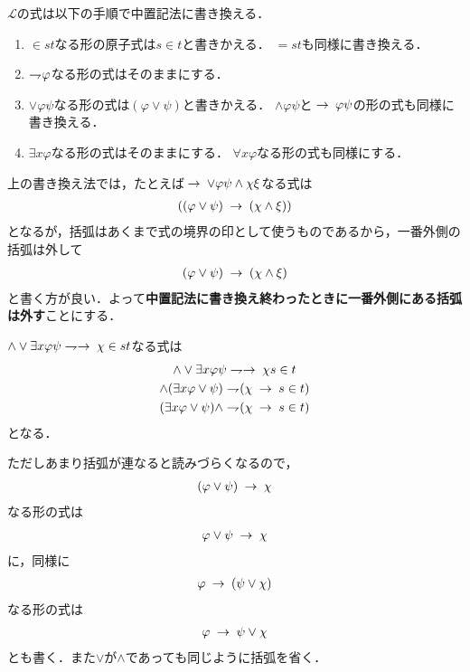 	\begin{screen}
		\begin{metadfn}[中置記法]
			$\mathcal{L}$の式は以下の手順で中置記法に書き換える．
			\begin{enumerate}
				\item $\in s t$なる形の原子式は$s \in t$と書きかえる．
					$= s t$も同様に書き換える．
					
				\item $\rightharpoondown\hspace{-0.25em} \varphi$なる形の式はそのままにする．
				
				\item $\vee \varphi \psi$なる形の式は$(\varphi \vee \psi)$と書きかえる．
					$\wedge \varphi \psi$と$\hspace{0.25em}\rightarrow\hspace{0.25em} \varphi \psi$の形の式も同様に書き換える．
				
				\item $\exists x \varphi$なる形の式はそのままにする．
					$\forall x \varphi$なる形の式も同様にする．
			\end{enumerate}
		\end{metadfn}
	\end{screen}
	
	上の書き換え法では，たとえば$\hspace{0.25em}\rightarrow\hspace{0.25em} \vee \varphi \psi \wedge \chi \xi$なる式は
	\begin{align}
		((\varphi \vee \psi) \hspace{0.25em}\rightarrow\hspace{0.25em} (\chi \wedge \xi))
	\end{align}
	となるが，括弧はあくまで式の境界の印として使うものであるから，一番外側の括弧は外して
	\begin{align}
		(\varphi \vee \psi) \hspace{0.25em}\rightarrow\hspace{0.25em} (\chi \wedge \xi)
	\end{align}
	と書く方が良い．よって{\bf 中置記法に書き換え終わったときに一番外側にある括弧は外す}ことにする．
	
	$\wedge \vee \exists x \varphi \psi \negation \rarrow \chi \in s t$なる式は
	\begin{align}
		\begin{gathered}
			\wedge \vee \exists x \varphi \psi \negation \rarrow \chi s \in t \\
			\wedge (\exists x \varphi \vee \psi) \negation (\chi \rarrow s \in t) \\
			(\exists x \varphi \vee \psi) \wedge \negation (\chi \rarrow s \in t)
		\end{gathered}
	\end{align}
	となる．
	
	ただしあまり括弧が連なると読みづらくなるので，
	\begin{align}
		(\varphi \vee \psi) \hspace{0.25em}\rightarrow\hspace{0.25em} \chi
	\end{align}
	なる形の式は
	\begin{align}
		\varphi \vee \psi \hspace{0.25em}\rightarrow\hspace{0.25em} \chi
	\end{align}
	に，同様に
	\begin{align}
		\varphi \hspace{0.25em}\rightarrow\hspace{0.25em} (\psi \vee \chi)
	\end{align}
	なる形の式は
	\begin{align}
		\varphi \hspace{0.25em}\rightarrow\hspace{0.25em} \psi \vee \chi
	\end{align}
	とも書く．また$\vee$が$\wedge$であっても同じように括弧を省く．